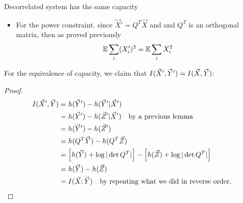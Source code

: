\documentclass[../main.tex]{subfiles}
\begin{document}
\begin{bbox}{Decorrelated system has the same capacity}
    \begin{itemize}
        \item For the power constraint. since $\vec X'=Q^T\vec X$ and and $Q^T$ is an orthogonal matrix, then as proved previously \[
            \mathbb{E} \sum_i(X'_i)^2 = \mathbb{E}\sum_i X_i^2
        \]
    \end{itemize}
    For the equivalence of capacity, we claim that $I(\vec X',\vec Y') = I(\vec X,\vec Y)$: \begin{proof}
        \begin{align*}
            I(\vec X',\vec Y) &= h(\vec Y')-h(\vec Y'|\vec X')\\
            &=h(\vec Y')-h(\vec Z'|\vec X') \quad\text{by a previous lemma}\\
            &=h(\vec Y')-h(\vec Z')\\
            &=h(Q^T \vec Y) - h(Q^T\vec Z)\\
            &=\left[h(\vec Y)+\log|\det Q^T|\right]-\left[h(\vec Z) +\log |\det Q^T|\right]\\
            &=h(\vec Y)-h(\vec Z)\\
            &= I(\vec X;\vec Y) \quad \text{by repeating what we did in reverse order.}
        \end{align*}
    \end{proof}
\end{bbox}
\end{document}

